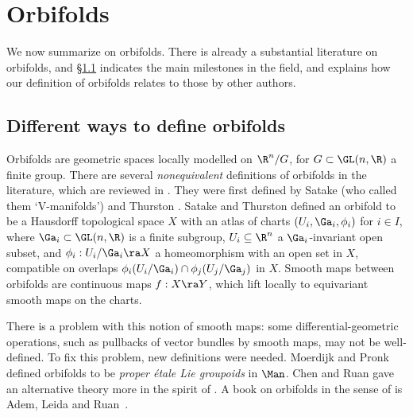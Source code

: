 \documentclass{article}
\begin{document}
\section{Orbifolds}
\label{ds9}

We now summarize \cite[\S 8.1--\S 8.4]{Joyc6} on orbifolds. There is
already a substantial literature on orbifolds, and \S\ref{ds91}
indicates the main milestones in the field, and explains how our
definition of orbifolds relates to those by other authors.

\subsection{Different ways to define orbifolds}
\label{ds91}

Orbifolds are geometric spaces locally modelled on $\R^n/G$, for
$G\subset\GL(n,\R)$ a finite group. There are several {\it
nonequivalent\/} definitions of orbifolds in the literature, which
are reviewed in \cite[\S 8.1]{Joyc6}. They were first defined by
Satake \cite{Sata} (who called them `V-manifolds') and Thurston
\cite[\S 13]{Thur}. Satake and Thurston defined an orbifold to be a
Hausdorff topological space $X$ with an atlas of charts
$(U_i,\Ga_i,\phi_i)$ for $i\in I$, where $\Ga_i\subset\GL(n,\R)$ is
a finite subgroup, $U_i\subseteq\R^n$ a $\Ga_i$-invariant open
subset, and $\phi_i:U_i/\Ga_i\ra X$ a homeomorphism with an open set
in $X$, compatible on overlaps $\phi_i(U_i/\Ga_i)
\cap\phi_j(U_j/\Ga_j)$ in $X$. Smooth maps between orbifolds are
continuous maps $f:X\ra Y$, which lift locally to equivariant smooth
maps on the charts.

There is a problem with this notion of smooth maps: some
differential-geometric operations, such as pullbacks of vector
bundles by smooth maps, may not be well-defined. To fix this
problem, new definitions were needed. Moerdijk and Pronk
\cite{Moer,MoPr} defined orbifolds to be {\it proper \'etale Lie
groupoids\/} in $\Man$. Chen and
Ruan \cite[\S 4]{ChRu} gave an alternative theory more in the spirit
of \cite{Sata,Thur}. A book on orbifolds in the sense of
\cite{ChRu,Moer,MoPr} is Adem, Leida and Ruan~\cite{ALR}.
\end{document}
